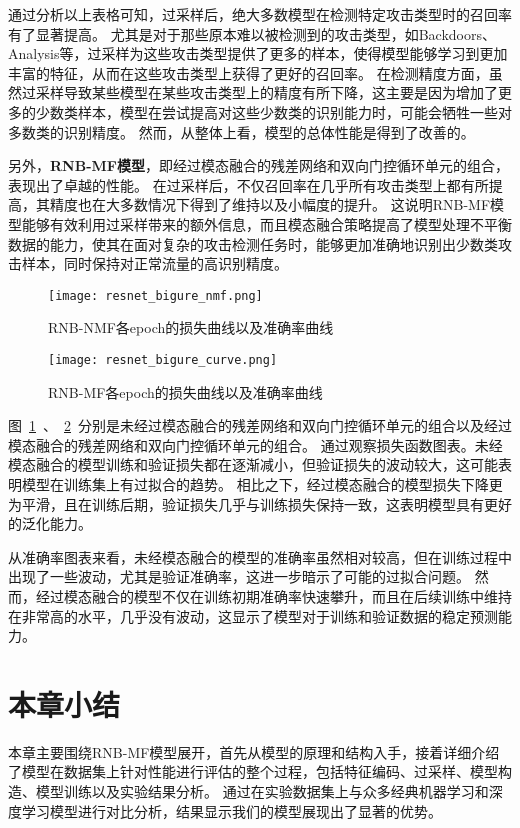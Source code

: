 通过分析以上表格可知，过采样后，绝大多数模型在检测特定攻击类型时的召回率有了显著提高。
尤其是对于那些原本难以被检测到的攻击类型，如Backdoors、Analysis等，过采样为这些攻击类型提供了更多的样本，使得模型能够学习到更加丰富的特征，从而在这些攻击类型上获得了更好的召回率。
在检测精度方面，虽然过采样导致某些模型在某些攻击类型上的精度有所下降，这主要是因为增加了更多的少数类样本，模型在尝试提高对这些少数类的识别能力时，可能会牺牲一些对多数类的识别精度。
然而，从整体上看，模型的总体性能是得到了改善的。\par

另外，\textbf{RNB-MF模型}，即经过模态融合的残差网络和双向门控循环单元的组合，表现出了卓越的性能。
在过采样后，不仅召回率在几乎所有攻击类型上都有所提高，其精度也在大多数情况下得到了维持以及小幅度的提升。
这说明RNB-MF模型能够有效利用过采样带来的额外信息，而且模态融合策略提高了模型处理不平衡数据的能力，使其在面对复杂的攻击检测任务时，能够更加准确地识别出少数类攻击样本，同时保持对正常流量的高识别精度。

\begin{figure}[htbp]
  \centering
  \texttt{[image: resnet\_bigure\_nmf.png]}
  \caption{RNB-NMF各epoch的损失曲线以及准确率曲线}
  \label{fig:ResNet-BiGRU-NoFusion}
\end{figure}

\begin{figure}[htbp]
  \centering
  \texttt{[image: resnet\_bigure\_curve.png]}
  \caption{RNB-MF各epoch的损失曲线以及准确率曲线}
  \label{fig:ResNet-BiGRU-Fusion}
\end{figure}
图~\ref{fig:ResNet-BiGRU-NoFusion}~、~\ref{fig:ResNet-BiGRU-Fusion}~分别是未经过模态融合的残差网络和双向门控循环单元的组合以及经过模态融合的残差网络和双向门控循环单元的组合。
通过观察损失函数图表。未经模态融合的模型训练和验证损失都在逐渐减小，但验证损失的波动较大，这可能表明模型在训练集上有过拟合的趋势。
相比之下，经过模态融合的模型损失下降更为平滑，且在训练后期，验证损失几乎与训练损失保持一致，这表明模型具有更好的泛化能力。\par

从准确率图表来看，未经模态融合的模型的准确率虽然相对较高，但在训练过程中出现了一些波动，尤其是验证准确率，这进一步暗示了可能的过拟合问题。
然而，经过模态融合的模型不仅在训练初期准确率快速攀升，而且在后续训练中维持在非常高的水平，几乎没有波动，这显示了模型对于训练和验证数据的稳定预测能力。\par


\section{本章小结}
本章主要围绕RNB-MF模型展开，首先从模型的原理和结构入手，接着详细介绍了模型在数据集上针对性能进行评估的整个过程，包括特征编码、过采样、模型构造、模型训练以及实验结果分析。
通过在实验数据集上与众多经典机器学习和深度学习模型进行对比分析，结果显示我们的模型展现出了显著的优势。\par

